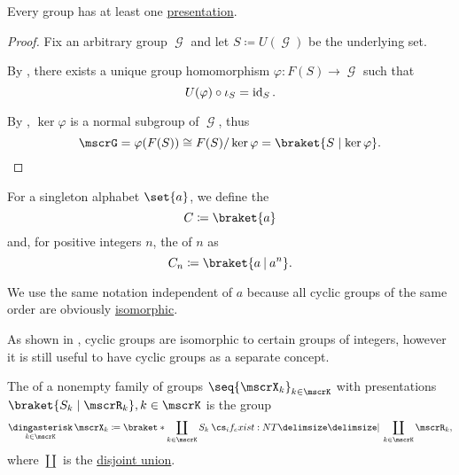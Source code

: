 \begin{theorem}\label{thm:every_group_is_representable}
  Every group has at least one \hyperref[def:group_presentation]{presentation}.
\end{theorem}
\begin{proof}
  Fix an arbitrary group \( \mscrG \) and let \( S \coloneqq U(\mscrG) \) be the underlying set.

  By , there exists a unique group homomorphism \( \varphi: F(S) \to \mscrG \) such that
  \begin{equation*}
    U(\varphi) \bincirc \iota_S = \id_S.
  \end{equation*}

  By , \( \ker \varphi \) is a normal subgroup of \( \mscrG \), thus
  \begin{equation*}
    \mscrG = \varphi(F(S)) \cong F(S) / \ker \varphi = \braket{ S \mid \ker \varphi }.
  \end{equation*}
\end{proof}

\begin{definition}\label{def:cyclic_group}
  For a singleton alphabet \( \set{ a } \), we define the 
  \begin{equation*}
    C \coloneqq \braket{a}
  \end{equation*}
  and, for positive integers \( n \), the  of  \( n \) as
  \begin{equation*}
    C_n \coloneqq \braket{a \given a^n}.
  \end{equation*}

  We use the same notation independent of \( a \) because all cyclic groups of the same order are obviously \hyperref[def:group/homomorphism]{isomorphic}.

  As shown in , cyclic groups are isomorphic to certain groups of integers, however it is still useful to have cyclic groups as a separate concept.
\end{definition}

\begin{definition}\label{def:group_free_product}
  The  of a nonempty family of groups \( \seq{ \mscrX_k }_{k \in \mscrK} \) with presentations \( \braket{S_k \mid \mscrR_k}, k \in \mscrK \) is the group
  \begin{equation*}
    \Ast_{k \in \mscrK} \mscrX_k \coloneqq \braket*{ \coprod_{k \in \mscrK} S_k \given* \coprod_{k \in \mscrK} \mscrR_k },
  \end{equation*}
  where \( \coprod \) is the \hyperref[def:disjoint_union]{disjoint union}.
\end{definition}

